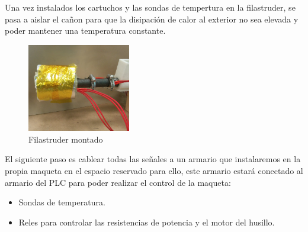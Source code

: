 Una vez instalados los cartuchos y las sondas de tempertura en la filastruder, se pasa a aislar el cañon para que la disipación de calor al exterior no sea elevada y poder mantener una temperatura constante.
    \begin{figure}[H]
            \centering
            \includegraphics[width=0.4\textwidth]{images/filaextruder/IMG_20150814_132929.jpg}
            \caption{Filastruder montado}
            \label{fig:fila_montaje4}
    \end{figure}

El siguiente paso es cablear todas las señales a un armario que instalaremos en la propia maqueta en el espacio reservado para ello, este armario estará conectado al armario del PLC para poder realizar el control de la maqueta:

\begin{itemize}
	\item Sondas de temperatura.
	\item Reles para controlar las resistencias de potencia y el motor del husillo.
\end{itemize}


